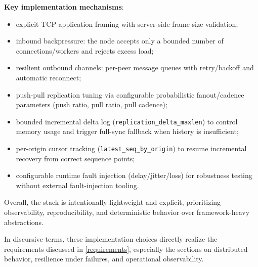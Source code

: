\textbf{Key implementation mechanisms}:
\begin{itemize}
  \item explicit TCP application framing with server-side frame-size validation;
  \item inbound backpressure: the node accepts only a bounded number of connections/workers and rejects excess load;
  \item resilient outbound channels: per-peer message queues with retry/backoff and automatic reconnect;
  \item push-pull replication tuning via configurable probabilistic fanout/cadence parameters (push ratio, pull ratio, pull cadence);
  \item bounded incremental delta log (\texttt{replication\_delta\_maxlen}) to control memory usage and trigger full-sync fallback when history is insufficient;
  \item per-origin cursor tracking (\texttt{latest\_seq\_by\_origin}) to resume incremental recovery from correct sequence points;
  \item configurable runtime fault injection (delay/jitter/loss) for robustness testing without external fault-injection tooling.
\end{itemize}

Overall, the stack is intentionally lightweight and explicit, prioritizing observability, reproducibility, and deterministic behavior over framework-heavy abstractions.

In discursive terms, these implementation choices directly realize the requirements discussed in \cref{requirements}, especially the sections on distributed behavior, resilience under failures, and operational observability.

\clearpage
